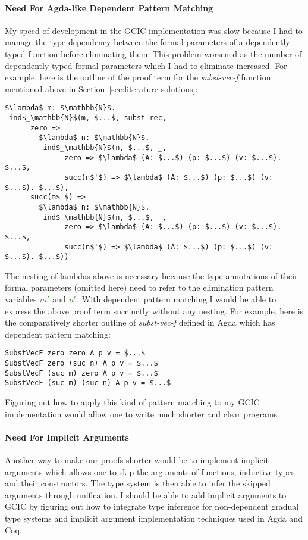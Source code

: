 \documentclass{article}
\theoremstyle{definition}
\newcommand{\Gcode}[1]{{\color{OliveGreen}\textit{#1}}}
\newcommand{\Gcmath}[1]{{\color{OliveGreen}#1}}
\begin{document}
\paragraph{Need For Agda-like Dependent Pattern Matching}
My speed of development in the GCIC implementation was slow because I had to
manage the type dependency between the formal parameters of a dependently typed
function before eliminating them. This problem worsened as the number of
dependently typed formal parameters which I had to eliminate increased. For
example, here is the outline of the proof term for the \Gcode{subst-vec-f}
function mentioned above in Section~\ref{sec:literature-solutions}:
\begin{lstlisting}[mathescape,language=GCIC]
$\lambda$ m: $\mathbb{N}$.
 ind$_\mathbb{N}$(m, $...$, subst-rec,
      zero =>
        $\lambda$ n: $\mathbb{N}$.
         ind$_\mathbb{N}$(n, $...$, _,
              zero => $\lambda$ (A: $...$) (p: $...$) (v: $...$). $...$,
              succ(n$'$) => $\lambda$ (A: $...$) (p: $...$) (v: $...$). $...$),
      succ(m$'$) =>
        $\lambda$ n: $\mathbb{N}$.
         ind$_\mathbb{N}$(n, $...$, _,
              zero => $\lambda$ (A: $...$) (p: $...$) (v: $...$). $...$,
              succ(n$'$) => $\lambda$ (A: $...$) (p: $...$) (v: $...$). $...$))
\end{lstlisting}
The nesting of lambdas above is necessary because the type annotations of their
formal parameters (omitted here) need to refer to the elimination pattern
variables \(\Gcmath{m'}\) and \(\Gcmath{n'}\). With dependent pattern matching I
would be able to express the above proof term succinctly without any nesting.
For example, here is the comparatively shorter outline of \Gcode{subst-vec-f}
defined in Agda which has dependent pattern matching:
\begin{lstlisting}[mathescape]
SubstVecF zero zero A p v = $...$
SubstVecF zero (suc n) A p v = $...$
SubstVecF (suc m) zero A p v = $...$
SubstVecF (suc m) (suc n) A p v = $...$
\end{lstlisting}
Figuring out how to apply this kind of pattern matching to my GCIC
implementation would allow one to write much shorter and clear programs.

\paragraph{Need For Implicit Arguments}
Another way to make our proofs shorter would be to implement implicit arguments
which allows one to skip the arguments of functions, inductive types and their
constructors. The type system is then able to infer the skipped arguments
through unification. I should be able to add implicit arguments to GCIC by
figuring out how to integrate type inference for non-dependent gradual type
systems\cite{siek_gradual_2008}\cite{garcia_principal_2015} and implicit
argument implementation techniques used in Agda and Coq.
\end{document}

